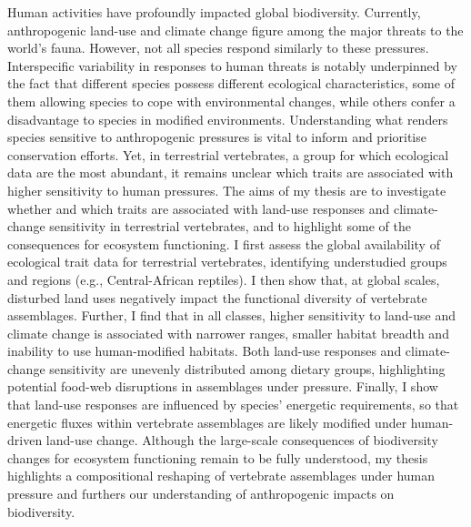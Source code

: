 
Human activities have profoundly impacted global biodiversity. Currently, anthropogenic land-use and climate change figure among the major threats to the world’s fauna. However, not all species respond similarly to these pressures. Interspecific variability in responses to human threats is notably underpinned by the fact that different species possess different ecological characteristics, some of them allowing species to cope with environmental changes, while others confer a disadvantage to species in modified environments. Understanding what renders species sensitive to anthropogenic pressures is vital to inform and prioritise conservation efforts. Yet, in terrestrial vertebrates, a group for which ecological data are the most abundant, it remains unclear which traits are associated with higher sensitivity to human pressures. The aims of my thesis are to investigate whether and which traits are associated with  land-use responses and climate-change sensitivity in terrestrial vertebrates, and to highlight some of the consequences for ecosystem functioning. I first assess the global availability of ecological trait data for terrestrial vertebrates, identifying understudied groups and regions (e.g., Central-African reptiles). I then show that, at global scales, disturbed land uses negatively impact the functional diversity of vertebrate assemblages.  Further, I find that in all classes, higher sensitivity to land-use and climate change is associated with  narrower ranges, smaller habitat breadth and inability to use human-modified habitats. Both land-use responses and climate-change sensitivity are unevenly distributed among dietary groups, highlighting potential food-web disruptions in assemblages under pressure.  Finally, I show that land-use responses are influenced by species' energetic requirements, so that energetic fluxes within vertebrate assemblages are likely modified under human-driven land-use change. Although the large-scale consequences of biodiversity changes for ecosystem functioning remain to be fully understood, my thesis highlights a compositional reshaping of vertebrate assemblages under human pressure and furthers our understanding of anthropogenic impacts on biodiversity.  